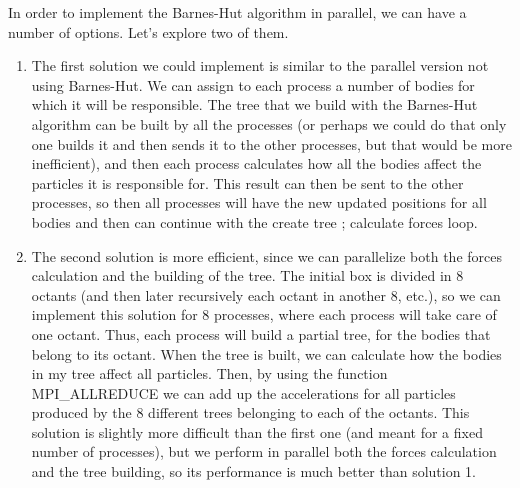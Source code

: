
In order to implement the Barnes-Hut algorithm in parallel, we can have a number
of options. Let's explore two of them.

\begin{enumerate}

\item The first solution we could implement is similar to the parallel version
  not using Barnes-Hut. We can assign to each process a number of bodies for
  which it will be responsible. The tree that we build with the Barnes-Hut
  algorithm can be built by all the processes (or perhaps we could do that only
  one builds it and then sends it to the other processes, but that would be more
  inefficient), and then each process calculates how all the bodies affect the
  particles it is responsible for. This result can then be sent to the other
  processes, so then all processes will have the new updated positions for all
  bodies and then can continue with the {create tree ; calculate forces} loop.

\item The second solution is more efficient, since we can parallelize both the
  forces calculation and the building of the tree. The initial box is divided in
  8 octants (and then later recursively each octant in another 8, etc.), so we
  can implement this solution for 8 processes, where each process will take care
  of one octant. Thus, each process will build a partial tree, for the bodies
  that belong to its octant. When the tree is built, we can calculate how the
  bodies in my tree affect all particles. Then, by using the function
  MPI\_ALLREDUCE we can add up the accelerations for all particles produced by
  the 8 different trees belonging to each of the octants. This solution is
  slightly more difficult than the first one (and meant for a fixed number of
  processes), but we perform in parallel both the forces calculation and the
  tree building, so its performance is much better than solution 1.
\end{enumerate}

